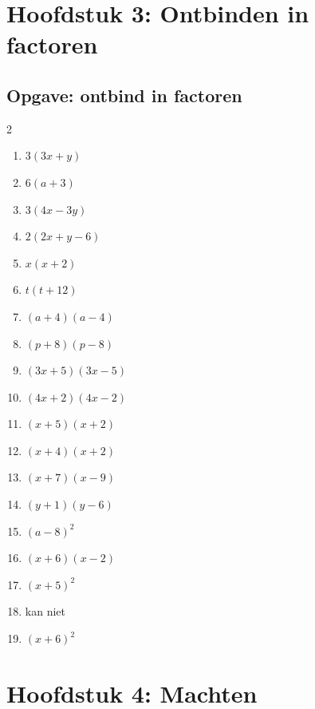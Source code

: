 \newpage
\section{Hoofdstuk 3: Ontbinden in factoren}
\subsection*{Opgave: ontbind in factoren}
\begin{multicols}{2}
\begin{enumerate}[label=\alph*)]
    \item $3(3x + y)$
    \item $6(a + 3)$
    \item $3(4x - 3y)$
    \item $2(2x + y - 6)$
    \item $x(x + 2)$
    \item $t(t + 12)$
    \item $(a + 4)(a - 4)$
    \item $(p + 8)(p - 8)$
    \item $(3x + 5)(3x - 5)$
    \item $(4x + 2)(4x - 2)$
    \item $(x + 5)(x + 2)$
    \item $(x + 4)(x + 2)$
    \item $(x + 7)(x - 9)$
    \item $(y + 1)(y - 6)$
    \item $(a - 8)^{2}$
    \item $(x + 6)(x - 2)$
    \item $(x + 5)^{2}$
    \item kan niet
    \item $(x + 6)^{2}$
\end{enumerate}
\end{multicols}

\newpage
\section{Hoofdstuk 4: Machten}
